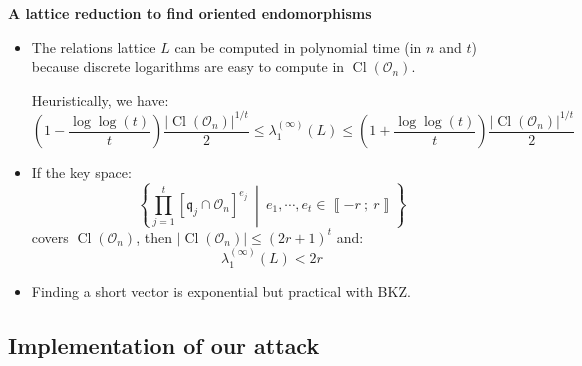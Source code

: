 \documentclass[10pt]{beamer}
\theoremstyle{plain}
\theoremstyle{definition}
\newcommand{\mO}{\mathcal{O}}
\renewcommand{\i}[2]{\left\llbracket #1~;~#2\right\rrbracket}
\renewcommand{\(}{\left(}
\renewcommand{\)}{\right)}
\newcommand{\mf}[1]{\mathfrak{#1}}
\DeclareMathOperator{\Cl}{Cl}
\begin{document}
\begin{frame}
\textbf{A lattice reduction to find oriented endomorphisms}

\vspace{0.3cm}

\begin{itemize}
\item The relations lattice $L$ can be computed in polynomial time (in $n$ and $t$) because discrete logarithms are easy to compute in $\Cl(\mO_n)$.

\pause 

\begin{lemma}
Heuristically, we have:
\[\(1-\frac{\log\log(t)}{t}\)\frac{|\Cl(\mO_n)|^{1/t}}{2}\leq \lambda_1^{(\infty)}(L)\leq \(1+\frac{\log\log(t)}{t}\)\frac{|\Cl(\mO_n)|^{1/t}}{2}\]
\end{lemma}

\pause 

\item If the key space:
\[\left\{\prod_{j=1}^t [\mf{q}_j\cap\mO_n]^{e_j} \ \middle| \ e_1,\cdots, e_t\in\i{-r}{r} \right\}\]
covers $\Cl(\mO_n)$, then $|\Cl(\mO_n)|\leq (2r+1)^t$ and:
\[\lambda_1^{(\infty)}(L)<2r\]

\item Finding a short vector is exponential but practical with BKZ.
\end{itemize}
\end{frame}

\subsection{Implementation of our attack}
\end{document}

